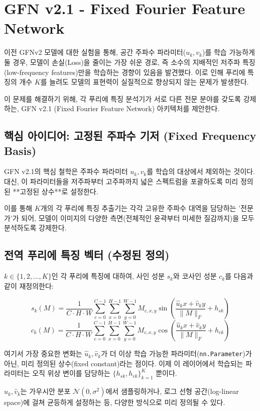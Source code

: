 \documentclass{book}
\begin{document}
\chapter{GFN v2.1 - Fixed Fourier Feature Network}

이전 GFNv2 모델에 대한 실험을 통해, 공간 주파수 파라미터($u_k, v_k$)를 학습 가능하게 둘 경우, 모델이 손실(Loss)을 줄이는 가장 쉬운 경로, 즉 소수의 지배적인 저주파 특징(low-frequency features)만을 학습하는 경향이 있음을 발견했다. 이로 인해 푸리에 특징의 개수 $K$를 늘려도 모델의 표현력이 실질적으로 향상되지 않는 문제가 발생한다.

이 문제를 해결하기 위해, 각 푸리에 특징 분석기가 서로 다른 전문 분야를 갖도록 강제하는, GFN v2.1 (Fixed Fourier Feature Network) 아키텍처를 제안한다.

\section{핵심 아이디어: 고정된 주파수 기저 (Fixed Frequency Basis)}
GFN v2.1의 핵심 철학은 주파수 파라미터 $u_k, v_k$를 학습의 대상에서 제외하는 것이다. 대신, 이 파라미터들을 저주파부터 고주파까지 넓은 스펙트럼을 포괄하도록 미리 정의된 **고정된 상수**로 설정한다.

이를 통해 $K$개의 각 푸리에 특징 추출기는 각각 고유한 주파수 대역을 담당하는 '전문가'가 되어, 모델이 이미지의 다양한 측면(전체적인 윤곽부터 미세한 질감까지)을 모두 분석하도록 강제한다.

\section{전역 푸리에 특징 벡터 (수정된 정의)}
$k \in \{1, 2, \dots, K\}$인 각 푸리에 특징에 대하여, 사인 성분 $s_k$와 코사인 성분 $c_k$를 다음과 같이 재정의한다:

\[
s_k(M) = \frac{1}{C \cdot H \cdot W} \sum_{c=0}^{C-1} \sum_{x=0}^{H-1} \sum_{y=0}^{W-1} M_{c,x,y} \sin\left( \frac{\hat{u}_k x + \hat{v}_k y}{\lVert M \rVert_F} + h_{sk} \right)
\]
\[
c_k(M) = \frac{1}{C \cdot H \cdot W} \sum_{c=0}^{C-1} \sum_{x=0}^{H-1} \sum_{y=0}^{W-1} M_{c,x,y} \cos\left( \frac{\hat{u}_k x + \hat{v}_k y}{\lVert M \rVert_F} + h_{ck} \right)
\]

여기서 가장 중요한 변화는 $\hat{u}_k, \hat{v}_k$가 더 이상 학습 가능한 파라미터(\texttt{nn.Parameter})가 아닌, 미리 정의된 상수(fixed constant)라는 점이다. 이제 이 레이어에서 학습되는 파라미터는 오직 위상 변이를 담당하는 $\{h_{sk}, h_{ck}\}_{k=1}^{K}$ 뿐이다.

$\hat{u}_k, \hat{v}_k$는 가우시안 분포 $\mathcal{N}(0, \sigma^2)$에서 샘플링하거나, 로그 선형 공간(log-linear space)에 걸쳐 균등하게 설정하는 등, 다양한 방식으로 미리 정의될 수 있다.
\end{document}
